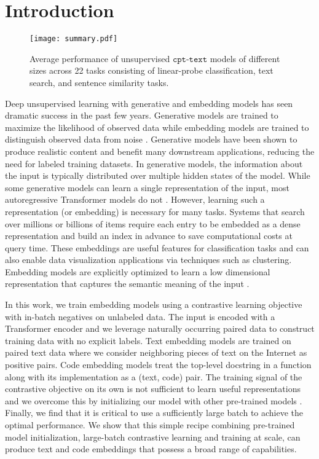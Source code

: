 \documentclass[nohyperref]{article}
\begin{document}
\section{Introduction}
\begin{figure}[h]
\centering
\texttt{[image: summary.pdf]}
\caption{Average performance of unsupervised $\texttt{cpt-text}$ models of different sizes across 22 tasks consisting of linear-probe classification, text search, and sentence similarity tasks.}
\label{fig:summary}
\end{figure}
Deep unsupervised learning with generative and embedding models has seen dramatic success in the past few years. Generative models \cite{elmo, t5, wavenet, dalle, gpt-3, codex} are trained to maximize the likelihood of observed data while embedding models are trained to distinguish observed data from noise \cite{inbatch,Oord,clip,align,simcse,contreiver}.  Generative models have been shown to produce realistic content and benefit many downstream applications, reducing the need for labeled training datasets. In generative models, the information about the input is typically distributed over multiple hidden states of the model. While some generative models \cite{vae,Kiros} can learn a single representation of the input, most autoregressive Transformer \cite{transformer} models do not \cite{t5, gpt-3, codex, dalle}. However, learning such a representation (or embedding) is necessary for many tasks. Systems that search over millions or billions of items require each entry to be embedded as a dense representation and build an index in advance to save computational costs at query time. These embeddings are useful features for classification tasks and can also enable data visualization applications via techniques such as clustering. Embedding models are explicitly optimized to learn a low dimensional representation that captures the semantic meaning of the input \cite{clip,align,declutr,simcse,contreiver}.   

In this work, we train embedding models using a contrastive learning objective with in-batch negatives \cite{inbatch,contrastive} on unlabeled data. The input is encoded with a Transformer encoder \cite{transformer} and we leverage naturally occurring paired data to construct training data with no explicit labels. Text embedding models are trained on paired text data where we consider neighboring pieces of text on the Internet as positive pairs. Code embedding models treat the top-level docstring in a function along with its implementation as a (text, code) pair. The training signal of the contrastive objective on its own is not sufficient to learn useful representations and we overcome this by initializing our model with other pre-trained models \cite{gpt-3,codex}. Finally, we find that it is critical to use a sufficiently large batch to achieve the optimal performance. We show that this simple recipe combining pre-trained model initialization, large-batch contrastive learning and training at scale, can produce text and code embeddings that possess a broad range of capabilities.
\end{document}

